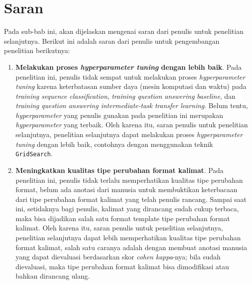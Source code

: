 \section{Saran}
\label{6.2}
Pada sub-bab ini, akan dijelaskan mengenai saran dari penulis untuk penelitian selanjutnya. Berikut ini adalah saran dari penulis untuk pengembangan penelitian berikutnya:

\begin{enumerate}
    
    \item \textbf{Melakukan proses \emph{hyperparameter tuning} dengan lebih baik}. Pada penelitian ini, penulis tidak sempat untuk melakukan proses \emph{hyperparameter tuning} karena keterbatasan sumber daya (mesin komputasi dan waktu) pada \emph{training sequence classification}, \emph{training question answering baseline}, dan \emph{training question answering intermediate-task transfer learning}. Belum tentu, \emph{hyperparameter} yang penulis gunakan pada penelitian ini merupakan \emph{hyperparameter} yang terbaik. Oleh karena itu, saran penulis untuk penelitian selanjutnya, penelitian selanjutnya dapat melakukan proses \emph{hyperparameter tuning} dengan lebih baik, contohnya dengan menggunakan teknik \texttt{GridSearch}.
    
    \item \textbf{Meningkatkan kualitas tipe perubahan format kalimat}. Pada penelitian ini, penulis tidak terlalu memperhatikan kualitas tipe perubahan format, belum ada anotasi dari manusia untuk membuktikan keterbacaan dari tipe perubahan format kalimat yang telah penulis rancang. Sampai saat ini, setidaknya bagi penulis, kalimat yang dirancang sudah cukup terbaca, maka bisa dijadikan salah satu format template tipe perubahan format kalimat. Oleh karena itu, saran penulis untuk penelitian selanjutnya, penelitian selanjutnya dapat lebih memperhatikan kualitas tipe perubahan format kalimat, salah satu caranya adalah dengan membuat anotasi manusia yang dapat dievaluasi berdasarkan skor \emph{cohen kappa}-nya; bila sudah dievaluasi, maka tipe perubahan format kalimat bisa dimodifikasi atau bahkan dirancang ulang.
    

\end{enumerate}
